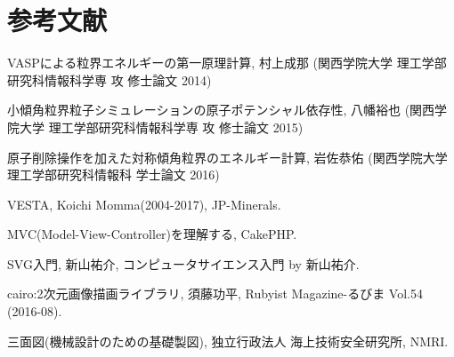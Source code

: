 \section{参考文献}
\begin{thebibliography}{9}
 VASPによる粒界エネルギーの第一原理計算, 村上成那 (関西学院大学 理工学部研究科情報科学専 攻 修士論文 2014)

 小傾角粒界粒子シミュレーションの原子ポテンシャル依存性, 八幡裕也 (関西学院大学 理工学部研究科情報科学専 攻 修士論文 2015)

 原子削除操作を加えた対称傾角粒界のエネルギー計算, 岩佐恭佑 (関西学院大学 理工学部研究科情報科 学士論文 2016)

 VESTA, Koichi Momma(2004-2017), JP-Minerals. %

 MVC(Model-View-Controller)を理解する, CakePHP. %

 SVG入門, 新山祐介, コンピュータサイエンス入門 by 新山祐介. %

 cairo:2次元画像描画ライブラリ, 須藤功平, Rubyist Magazine-るびま Vol.54 (2016-08). %

 三面図(機械設計のための基礎製図), 独立行政法人 海上技術安全研究所, NMRI. %
\end{thebibliography}

